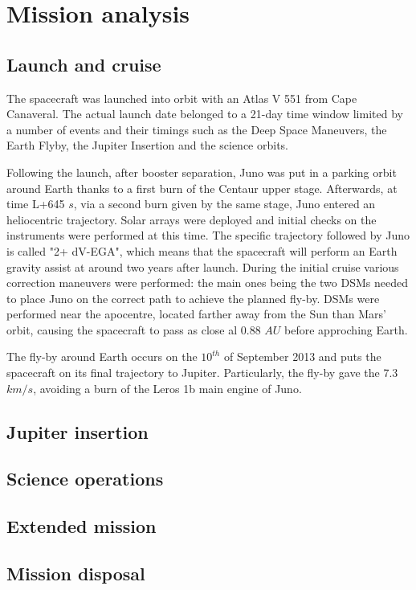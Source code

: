 \section{Mission analysis}
\label{sec:mission_analysis}

\subsection{Launch and cruise}
\label{sec: lancio e crociera}

The spacecraft was launched into orbit with an Atlas V 551 from Cape Canaveral. The actual launch date belonged to a 21-day time window limited by a number of events and their timings such as the Deep Space Maneuvers, the Earth Flyby, the Jupiter Insertion and the science orbits.

Following the launch, after booster separation, Juno was put in a parking orbit around Earth thanks to a first burn of the Centaur upper stage. Afterwards, at time L+645 $s$, via a second burn given by the same stage, Juno entered an heliocentric trajectory. Solar arrays were deployed and initial checks on the instruments were performed at this time.
The specific trajectory followed by Juno is called "2+ dV-EGA", which means that the spacecraft will perform an Earth gravity assist at around two years after launch.
During the initial cruise various correction maneuvers were performed: the main ones being the two DSMs needed to place Juno on the correct path to achieve the planned fly-by. 
DSMs were performed near the apocentre, located farther away from the Sun than Mars' orbit, causing the spacecraft to pass as close al 0.88 $AU$ before approching Earth. 

The fly-by around Earth occurs on the $10^{th}$ of September 2013 and puts the spacecraft on its final trajectory to Jupiter. Particularly, the fly-by gave the 7.3 $km/s$, avoiding a burn of the Leros 1b main engine of Juno. 


\subsection{Jupiter insertion}
\label{sec: joi}

\subsection{Science operations}
\label{sec: science ops}

\subsection{Extended mission}
\label{sec: extended}

\subsection{Mission disposal}
\label{sec: disposal}

